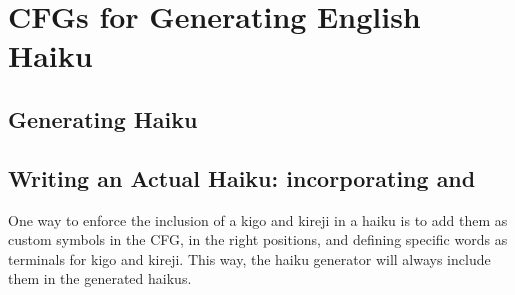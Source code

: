 \section{CFGs for Generating English Haiku}

\subsection{Generating Haiku}

\subsection{Writing an Actual Haiku: incorporating  and }

One way to enforce the inclusion of a kigo and kireji in a haiku is to add them as custom symbols in the CFG,
in the right positions, and defining specific words as terminals for kigo and kireji.
This way, the haiku generator will always include them in the generated haikus.

\begin{enumarabic}
  \item 
\end{enumarabic}
